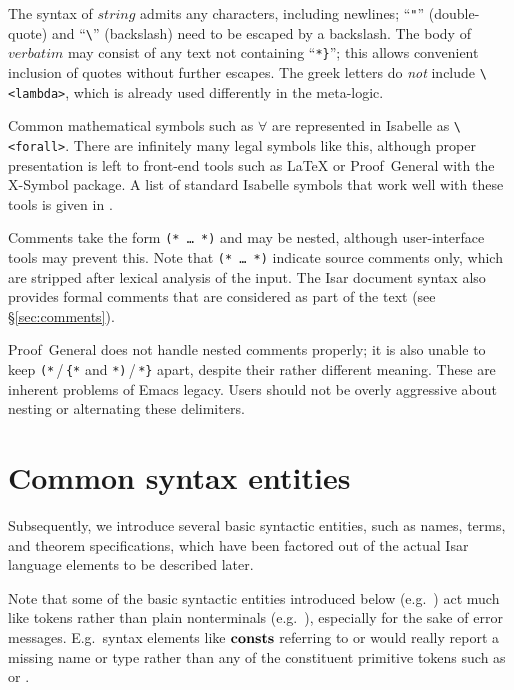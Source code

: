 The syntax of $string$ admits any characters, including newlines; ``\verb|"|''
(double-quote) and ``\verb|\|'' (backslash) need to be escaped by a backslash.
The body of $verbatim$ may consist of any text not containing ``\verb|*}|'';
this allows convenient inclusion of quotes without further escapes.  The greek
letters do \emph{not} include \verb,\<lambda>,, which is already used
differently in the meta-logic.

Common mathematical symbols such as $\forall$ are represented in Isabelle as
\verb,\<forall>,.  There are infinitely many legal symbols like this, although
proper presentation is left to front-end tools such as {\LaTeX} or
Proof~General with the X-Symbol package.  A list of standard Isabelle symbols
that work well with these tools is given in \cite[appendix~A]{isabelle-sys}.

Comments take the form \texttt{(*~\dots~*)} and may be nested, although
user-interface tools may prevent this.  Note that \texttt{(*~\dots~*)}
indicate source comments only, which are stripped after lexical analysis of
the input.  The Isar document syntax also provides formal comments that are
considered as part of the text (see \S\ref{sec:comments}).

\begin{warn}
  Proof~General does not handle nested comments properly; it is also unable to
  keep \verb,(*,\,/\,\verb,{*, and \verb,*),\,/\,\verb,*}, apart, despite
  their rather different meaning.  These are inherent problems of Emacs
  legacy.  Users should not be overly aggressive about nesting or alternating
  these delimiters.
\end{warn}


\section{Common syntax entities}

Subsequently, we introduce several basic syntactic entities, such as names,
terms, and theorem specifications, which have been factored out of the actual
Isar language elements to be described later.

Note that some of the basic syntactic entities introduced below (e.g.\
) act much like tokens rather than plain nonterminals (e.g.\
), especially for the sake of error messages.  E.g.\ syntax
elements like ${\mathord{\mathbf{consts}}}$ referring to \railqtok{name} or \railqtok{type} would
really report a missing name or type rather than any of the constituent
primitive tokens such as \railtok{ident} or \railtok{string}.



